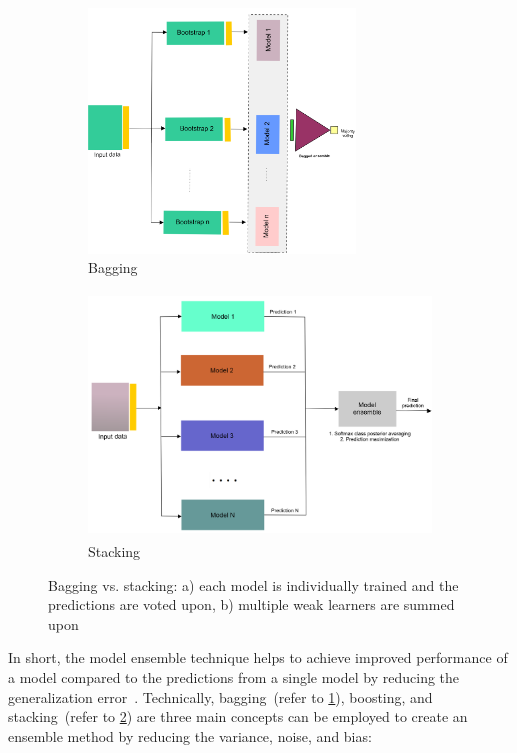\begin{figure}[htp!]
	\centering
	\begin{subfigure}{.48\linewidth}
		\centering
		\includegraphics[width=\linewidth,height=65mm]{images/bagging.png}
		\caption{Bagging}
        \label{fig:bagging}
	\end{subfigure}
	\hspace{2mm}
	\begin{subfigure}{0.48\linewidth}
		\centering
		\includegraphics[width=\linewidth,height=65mm]{images/stacking.png}
		\caption{Stacking}
        \label{fig:stacking}
	\end{subfigure}
	\caption{Bagging vs. stacking: a) each model is individually trained and the predictions are voted upon, b) multiple weak learners are summed upon} 
	\label{fig:bagging_and_stacking}
	\vspace{-2mm}
\end{figure}

\hspace*{3.5mm} In short, the model ensemble technique helps to achieve improved performance of a model compared to the predictions from a single model by reducing the generalization error~\cite{karimACCA2019}. Technically, bagging~(refer to \cref{fig:bagging}), boosting, and stacking~(refer to \cref{fig:stacking}) are three main concepts can be employed to create an ensemble method by reducing the variance, noise, and bias: \\

